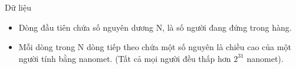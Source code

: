 Dữ liệu
\begin{itemize}
	\item     Dòng đầu tiên chứa số nguyên dương N, là số người đang đứng trong hàng.   
	\item     Mỗi dòng trong N dòng tiếp theo chứa một số nguyên là chiều cao của một người tính bằng nanomet. (Tất cả mọi người đều thấp hơn $2^{31}$    nanomet).   
\end{itemize}